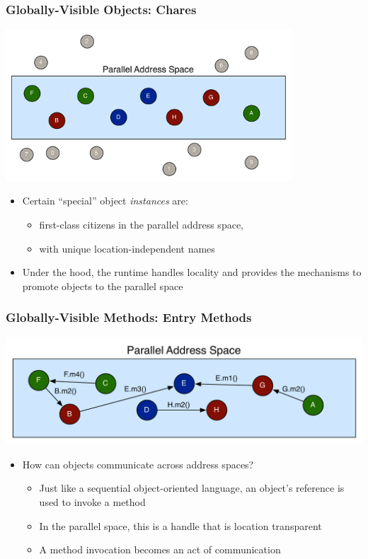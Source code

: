 \begin{frame}[fragile]
  \frametitle{Globally-Visible Objects: Chares}
  \begin{center}
    \includegraphics[width=0.8\textwidth]{figures/objectGlobalAddress.pdf}
  \end{center}
  \begin{itemize}
    \item Certain ``special'' object \emph{instances} are:
      \begin{itemize}
      \item first-class citizens in the parallel address space,
      \item with unique location-independent names
      \end{itemize}
    \item Under the hood, the runtime handles locality and provides the
      mechanisms to promote objects to the parallel space
  \end{itemize}
\end{frame}

\begin{frame}[fragile]
  \frametitle{Globally-Visible Methods: Entry Methods}
  \begin{center}
    \includegraphics[width=\textwidth]{figures/objectMethodGlobalAddress.pdf}
  \end{center}
  \begin{itemize}
    \item How can objects communicate across address spaces?
      \begin{itemize}
      \item Just like a sequential object-oriented language, an object's
        reference is used to invoke a method
      \item In the parallel space, this is a handle that is location
          transparent
      \item A method invocation becomes an act of communication
      \end{itemize}
  \end{itemize}
\end{frame}

